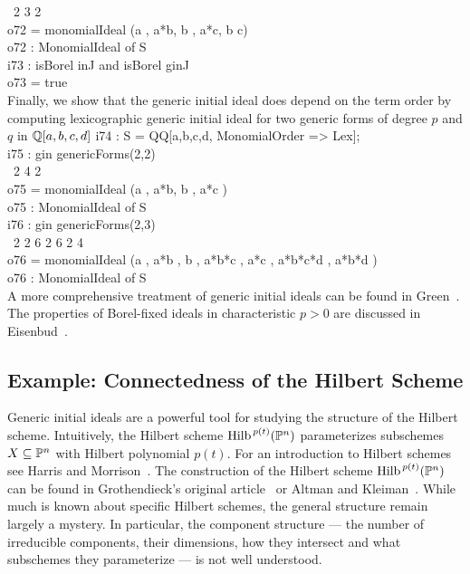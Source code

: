 \                      2        3        2\\
o72 = monomialIdeal (a , a*b, b , a*c, b c)\\
\emptyLine
o72 : MonomialIdeal of S\\
\endOutput
\beginOutput
i73 : isBorel inJ and isBorel ginJ\\
\emptyLine
o73 = true\\
\endOutput
Finally, we show that the generic initial ideal does depend on the
term order by computing lexicographic generic initial ideal for two
generic forms of degree $p$ and $q$ in ${\mathbb Q}[a,b,c,d]$
\beginOutput
i74 : S = QQ[a,b,c,d, MonomialOrder => Lex];\\
\endOutput
\beginOutput
i75 : gin genericForms(2,2)\\
\emptyLine
\                      2        4     2\\
o75 = monomialIdeal (a , a*b, b , a*c )\\
\emptyLine
o75 : MonomialIdeal of S\\
\endOutput
\beginOutput
i76 : gin genericForms(2,3)\\
\emptyLine
\                      2     2   6       2     6         2       4\\
o76 = monomialIdeal (a , a*b , b , a*b*c , a*c , a*b*c*d , a*b*d )\\
\emptyLine
o76 : MonomialIdeal of S\\
\endOutput
A more comprehensive treatment of generic initial ideals can be found
in Green~\cite{MR99m:13040}.  The properties of Borel-fixed ideals in
characteristic $p>0$ are discussed in Eisenbud~\cite{MR97a:13001}.


\subsection*{Example: Connectedness of the Hilbert Scheme}

Generic initial ideals are a powerful tool for studying the structure
of the Hilbert scheme.  Intuitively, the Hilbert
scheme $\operatorname{Hilb}^{\, p(t)}({\mathbb P}^{n})$ parameterizes subschemes $X
\subseteq {\mathbb P}^{n}$ with Hilbert polynomial $p(t)$.  For an
introduction to Hilbert schemes see Harris and
Morrison~\cite{MR99g:14031}.  The construction of the Hilbert scheme $\operatorname{Hilb}^{\,
p(t)}({\mathbb P}^{n})$ can be found in Grothendieck's original
article~\cite{MR26:3566} or Altman and Kleiman~\cite{MR81f:14025a}.
While much is known about specific Hilbert schemes, the general
structure remain largely a mystery.  In particular, the component
structure --- the number of irreducible components, their dimensions,
how they intersect and what subschemes they parameterize --- is not
well understood.

